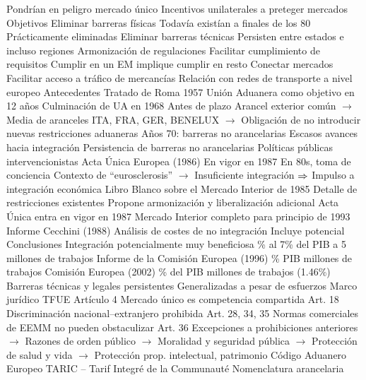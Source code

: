 \documentclass{nuevotema}
\begin{document}
\begin{esquemal}
				\4[] Pondrían en peligro mercado único
				\4[] Incentivos unilaterales a preteger mercados
		\2 Objetivos
			\3 Eliminar barreras físicas
				\4 Todavía existían a finales de los 80
				\4 Prácticamente eliminadas
			\3 Eliminar barreras técnicas
				\4 Persisten entre estados e incluso regiones
			\3 Armonización de regulaciones
				\4 Facilitar cumplimiento de requisitos
				\4[] Cumplir en un EM implique cumplir en resto
			\3 Conectar mercados
				\4 Facilitar acceso a tráfico de mercancías
				\4 Relación con redes de transporte a nivel europeo
		\2 Antecedentes
			\3 Tratado de Roma 1957
				\4 Unión Aduanera como objetivo en 12 años
			\3 Culminación de UA en 1968
				\4 Antes de plazo
				\4 Arancel exterior común
				\4[] $\to$ Media de aranceles ITA, FRA, GER, BENELUX
				\4[] $\to$ Obligación de no introducir nuevas restricciones aduaneras
			\3 Años 70: barreras no arancelarias
				\4 Escasos avances hacia integración
				\4 Persistencia de barreras no arancelarias
				\4 Políticas públicas intervencionistas
			\3 Acta Única Europea (1986)
				\4 En vigor en 1987
				\4 En 80s, toma de conciencia
				\4[] Contexto de ``eurosclerosis''
				\4[] $\to$ Insuficiente integración
				\4[] $\Rightarrow$ Impulso a integración económica
				\4 Libro Blanco sobre el Mercado Interior de 1985
				\4[] Detalle de restricciones existentes
				\4[] Propone armonización y liberalización adicional
				\4 Acta Única entra en vigor en 1987
				\4 Mercado Interior completo para principio de  1993
			\3 Informe Cecchini (1988)
				\4 Análisis de costes de no integración
				\4[] Incluye potencial
				\4 Conclusiones
				\4[] Integración potencialmente muy beneficiosa
				\% al 7\% del PIB
				 a 5 millones de trabajos
			\3 Informe de la Comisión Europea (1996)
				\% PIB
				 millones de trabajos
			\3 Comisión Europea (2002)
				\% del PIB
				 millones de trabajos (1.46\%)
			\3 Barreras técnicas y legales persistentes
				\4 Generalizadas a pesar de esfuerzos
		\2 Marco jurídico
			\3 TFUE
				\4 Artículo 4
				\4[] Mercado único es competencia compartida
				\4 Art. 18
				\4[] Discriminación nacional--extranjero prohibida
				\4 Art. 28, 34, 35
				\4[] Normas comerciales de EEMM no pueden obstaculizar
				\4 Art. 36
				\4[] Excepciones a prohibiciones anteriores
				\4[] $\to$ Razones de orden público
				\4[] $\to$ Moralidad y seguridad pública
				\4[] $\to$ Protección de salud y vida
				\4[] $\to$ Protección prop. intelectual, patrimonio
			\3 Código Aduanero Europeo
				\4 TARIC -- Tarif Integré de la Communauté
				\4[] Nomenclatura arancelaria

\end{esquemal}
\end{document}
